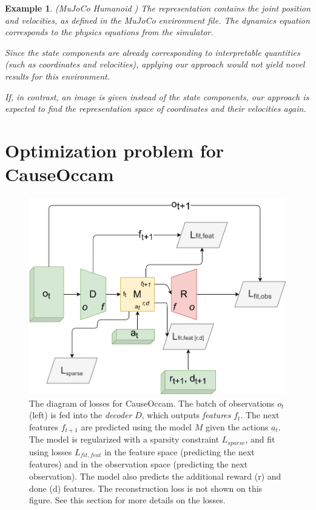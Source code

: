 \documentclass[a4paper,11pt,oneside]{report}
\newtheorem{example}{Example}[section]
\newcommand{\sysname}{CauseOccam\xspace}
\begin{document}

\begin{example}{(MuJoCo Humanoid \cite{brockman2016openai})}
    The representation contains the joint position and velocities, as defined in the MuJoCo environment file. The dynamics equation corresponds to the physics equations from the simulator.

    Since the state components are already corresponding to interpretable quantities (such as coordinates and velocities), applying our approach would not yield novel results for this environment.

    If, in contrast, an image is given instead of the state components, our approach is expected to find the representation space of coordinates and their velocities again.
\end{example}


\section{Optimization problem for \sysname}
\begin{figure}[h]
    \centering
    \includegraphics[width=0.7\linewidth]{diagrams/architecture_losses}
    \caption{The diagram of losses for \sysname. The batch of observations $o_t$ (left) is fed into the {\em decoder} $D$, which outputs {\em features} $f_t$. The next features $f_{t+1}$ are predicted using the model $M$ given the actions $a_t$. The model is regularized with a sparsity constraint $L_{sparse}$, and fit using losses $L_{fit,feat}$ in the feature space (predicting the next features) and in the observation space (predicting the next observation). The model also predicts the additional reward (r) and done (d) features. The reconstruction loss is not shown on this figure. See this section for more details on the losses.}
    \label{fig:architecture_losses}
\end{figure}
\end{document}
